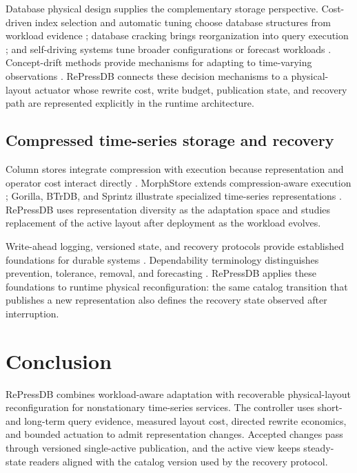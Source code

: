 \documentclass[final,5p,times,twocolumn,authoryear]{elsarticle}
\begin{document}
Database physical design supplies the complementary storage perspective. Cost-driven index selection and automatic tuning choose database structures from workload evidence \citep{chaudhuri1997autoadmin,bruno2005physical}; database cracking brings reorganization into query execution \citep{idreos2007cracking}; and self-driving systems tune broader configurations or forecast workloads \citep{vanaken2017ottertune,pavlo2017selfdriving,li2026forecasting}. Concept-drift methods provide mechanisms for adapting to time-varying observations \citep{gama2014drift,bifet2007adwin}. RePressDB connects these decision mechanisms to a physical-layout actuator whose rewrite cost, write budget, publication state, and recovery path are represented explicitly in the runtime architecture.

\subsection{Compressed time-series storage and recovery}

Column stores integrate compression with execution because representation and operator cost interact directly \citep{stonebraker2005cstore,abadi2006compression}. MorphStore extends compression-aware execution \citep{damme2020morphstore}; Gorilla, BTrDB, and Sprintz illustrate specialized time-series representations \citep{pelkonen2015gorilla,andersen2016btrdb,blalock2018sprintz}. RePressDB uses representation diversity as the adaptation space and studies replacement of the active layout after deployment as the workload evolves.

Write-ahead logging, versioned state, and recovery protocols provide established foundations for durable systems \citep{mohan1992aries,gray1992transaction,sqlitewal}. Dependability terminology distinguishes prevention, tolerance, removal, and forecasting \citep{avizienis2004dependability}. RePressDB applies these foundations to runtime physical reconfiguration: the same catalog transition that publishes a new representation also defines the recovery state observed after interruption.

\section{Conclusion}
\label{sec:conclusion}

RePressDB combines workload-aware adaptation with recoverable physical-layout reconfiguration for nonstationary time-series services. The controller uses short- and long-term query evidence, measured layout cost, directed rewrite economics, and bounded actuation to admit representation changes. Accepted changes pass through versioned single-active publication, and the active view keeps steady-state readers aligned with the catalog version used by the recovery protocol.
\end{document}
